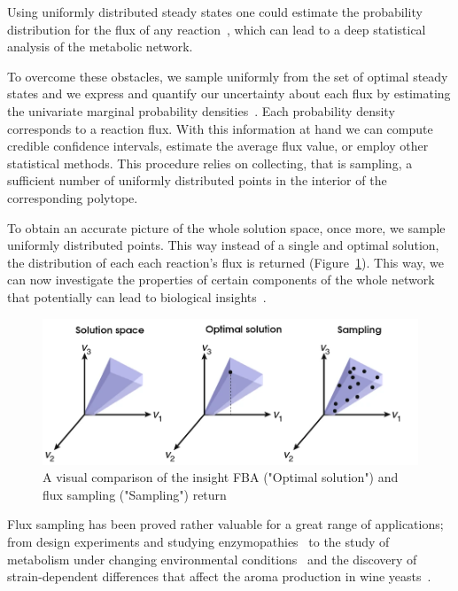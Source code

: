       Using uniformly distributed steady states one could estimate the probability
      distribution for the flux of any reaction~\citep{herrmann2019flux}, 
      which can lead to a deep statistical analysis of the metabolic network. 


      To overcome these obstacles, we sample uniformly from the set of optimal steady
      states and we express and quantify our uncertainty about each flux by estimating
      the univariate marginal probability densities~\citep{schellenberger2009use}. 
      Each probability density corresponds to a reaction flux. 
      With this information at hand we can compute credible confidence intervals, 
      estimate the average flux value, or employ other statistical methods. 
      This procedure relies on collecting, that is sampling, 
      a sufficient number of uniformly distributed points in the interior of the corresponding polytope.

      To obtain an accurate picture of the whole solution space,
      once more, we sample uniformly distributed points.
      This way instead of a single and optimal solution, 
      the distribution of each each reaction's flux is returned (Figure~\ref{fig:spaces}). 
      This way, we can now investigate the properties of certain components of the whole network 
      that potentially can lead to
      biological insights~\citep{palsson2015systems}.

      \begin{figure}[!h]
         \centering
         \includegraphics[width=.9\textwidth]{figures/solution_spaces_transparent.png}
         \caption[Flux sampling compared to FBA]{A visual comparison of the insight FBA ("Optimal solution") and flux sampling ("Sampling") return}
         \label{fig:spaces}
      \end{figure}


      Flux sampling has been proved rather valuable for a great range of applications;
      from design experiments and studying enzymopathies~\citep{price2004uniform}
      to the study of metabolism under changing environmental conditions~\citep{herrmann2019flux}
      and the discovery of strain-dependent differences 
      that affect the aroma production in wine yeasts~\citep{scott2021metabolic}. 
      
